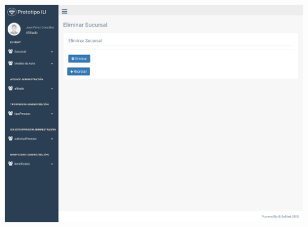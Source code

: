 \includegraphics[width=\linewidth]{ui-prototype/SucursalServices/EliminarSucursalPage.png}


%

\clearpage

\printglossary

